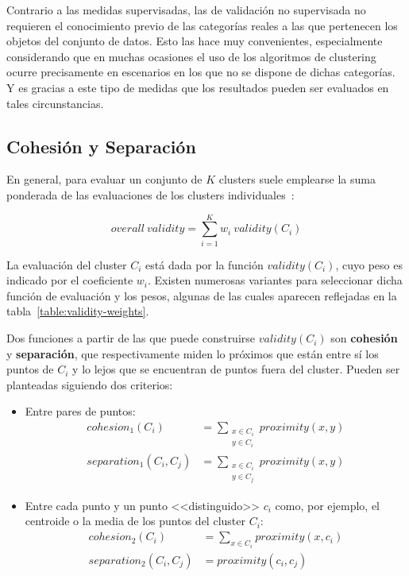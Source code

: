Contrario a las medidas supervisadas, las de validación no supervisada no requieren el conocimiento previo de las categorías reales a las que pertenecen los objetos del conjunto de datos.
Esto las hace muy convenientes, especialmente considerando que en muchas ocasiones el uso de los algoritmos de clustering ocurre precisamente en escenarios en los que no se dispone de dichas categorías.
Y es gracias a este tipo de medidas que los resultados pueden ser evaluados en tales circunstancias.

\subsection{Cohesión y Separación}\label{subsec:cohesiónYSeparación}

En general, para evaluar un conjunto de $K$ clusters suele emplearse la suma ponderada de las evaluaciones de los clusters individuales~\cite{Tan05}:

\begin{equation}
    \label{eq:overall-validity}
    overall\ validity = \sum_{i=1}^{K}{w_i\ validity(C_i)}
\end{equation}

La evaluación del cluster $C_i$ está dada por la función $validity(C_i)$, cuyo peso es indicado por el coeficiente $w_i$.
Existen numerosas variantes para seleccionar dicha función de evaluación y los pesos, algunas de las cuales aparecen reflejadas en la tabla~\ref{table:validity-weights}.

Dos funciones a partir de las que puede construirse $validity(C_i)$ son \textbf{cohesión} y \textbf{separación}, que respectivamente miden lo próximos que están entre sí los puntos de $C_i$ y lo lejos que se encuentran de puntos fuera del cluster.
Pueden ser planteadas siguiendo dos criterios:

\begin{itemize}
    \item Entre pares de puntos:
    \begin{align}
        cohesion_1(C_i) & = \sum_{\substack{x\in C_i \\ y\in C_i}}{proximity(x,y)} \\
        separation_1(C_i, C_j) & = \sum_{\substack{x\in C_i \\ y\in C_j}}{proximity(x,y)}
    \end{align}

    \item Entre cada punto y un punto <<distinguido>> $c_i$ como, por ejemplo, el centroide o la media de los puntos del cluster $C_i$:
    \begin{align}
        \label{eq:selected-point-cohesion}
        cohesion_2(C_i) & = \sum_{x\in C_i}{proximity(x,c_i)} \\
        \label{eq:selected-point-separation}
        separation_2(C_i, C_j) & = proximity(c_i,c_j)
    \end{align}
\end{itemize}

